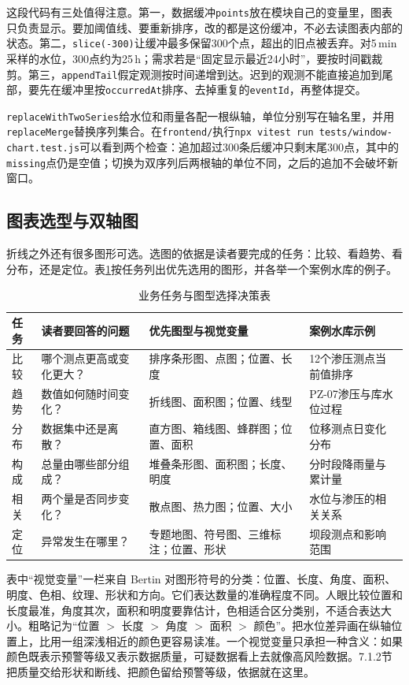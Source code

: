 这段代码有三处值得注意。第一，数据缓冲\texttt{points}放在模块自己的变量里，图表只负责显示。要加阈值线、要重新排序，改的都是这份缓冲，不必去读图表内部的状态。第二，\texttt{slice(-300)}让缓冲最多保留300个点，超出的旧点被丢弃。对5\,min采样的水位，300点约为25\,h；需求若是“固定显示最近24小时”，要按时间戳裁剪。第三，\texttt{appendTail}假定观测按时间递增到达。迟到的观测不能直接追加到尾部，要先在缓冲里按\texttt{occurredAt}排序、去掉重复的\texttt{eventId}，再整体提交。

\texttt{replaceWithTwoSeries}给水位和雨量各配一根纵轴，单位分别写在轴名里，并用\texttt{replaceMerge}替换序列集合。在\texttt{frontend/}执行\texttt{npx vitest run tests/window-chart.test.js}可以看到两个检查：追加超过300条后缓冲只剩末尾300点，其中的\texttt{missing}点仍是空值；切换为双序列后两根轴的单位不同，之后的追加不会破坏新窗口。

\subsection{图表选型与双轴图}

折线之外还有很多图形可选。选图的依据是读者要完成的任务：比较、看趋势、看分布，还是定位。表\ref{tab:ch7-task-chart}按任务列出优先选用的图形，并各举一个案例水库的例子。

\begin{table}[htbp]
\centering
\caption{业务任务与图型选择决策表}
\label{tab:ch7-task-chart}
\begin{tabular}{p{2.0cm}p{3.3cm}p{4.0cm}p{3.3cm}}
\toprule
任务 & 读者要回答的问题 & 优先图型与视觉变量 & 案例水库示例 \\
\midrule
比较 & 哪个测点更高或变化更大？ & 排序条形图、点图；位置、长度 & 12个渗压测点当前值排序 \\
趋势 & 数值如何随时间变化？ & 折线图、面积图；位置、线型 & PZ-07渗压与库水位过程 \\
分布 & 数据集中还是离散？ & 直方图、箱线图、蜂群图；位置、面积 & 位移测点日变化分布 \\
构成 & 总量由哪些部分组成？ & 堆叠条形图、面积图；长度、明度 & 分时段降雨量与累计量 \\
相关 & 两个量是否同步变化？ & 散点图、热力图；位置、大小 & 水位与渗压的相关关系 \\
定位 & 异常发生在哪里？ & 专题地图、符号图、三维标注；位置、形状 & 坝段测点和影响范围 \\
\bottomrule
\end{tabular}
\end{table}

表中“视觉变量”一栏来自 Bertin 对图形符号的分类：位置、长度、角度、面积、明度、色相、纹理、形状和方向。它们表达数量的准确程度不同。人眼比较位置和长度最准，角度其次，面积和明度要靠估计，色相适合区分类别，不适合表达大小。粗略记为“位置 $>$ 长度 $>$ 角度 $>$ 面积 $>$ 颜色”。把水位差异画在纵轴位置上，比用一组深浅相近的颜色更容易读准。一个视觉变量只承担一种含义：如果颜色既表示预警等级又表示数据质量，可疑数据看上去就像高风险数据。7.1.2节把质量交给形状和断线、把颜色留给预警等级，依据就在这里。


